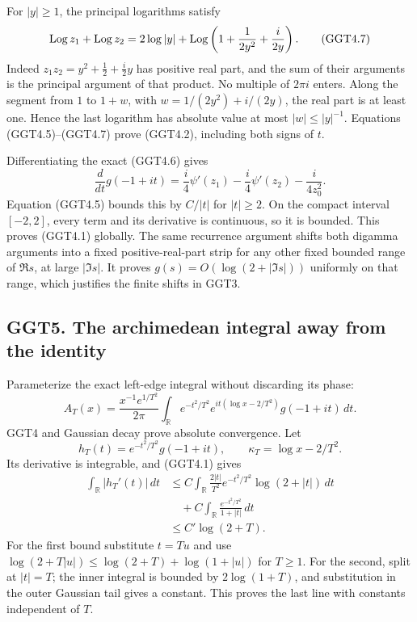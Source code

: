 For \(|y|\ge1\), the principal logarithms satisfy \[
\operatorname{Log} z_1+\operatorname{Log} z_2
=2\log|y|
+\operatorname{Log}\left(1+\frac1{2y^2}+\frac{i}{2y}\right).
\tag{GGT4.7}
\] Indeed \(z_1z_2=y^2+\tfrac12+\tfrac{i}{2}y\) has positive real part,
and the sum of their arguments is the principal argument of that
product. No multiple of \(2\pi i\) enters. Along the segment from \(1\)
to \(1+w\), with \(w=1/(2y^2)+i/(2y)\), the real part is at least one.
Hence the last logarithm has absolute value at most \(|w|\le |y|^{-1}\).
Equations (GGT4.5)--(GGT4.7) prove (GGT4.2), including both signs of
\(t\).

Differentiating the exact (GGT4.6) gives \[
\frac d{dt}g(-1+it)
=\frac i4\psi'(z_1)-\frac i4\psi'(z_2)
-\frac i{4z_0^2}.
\tag{GGT4.8}
\] Equation (GGT4.5) bounds this by \(C/|t|\) for \(|t|\ge2\). On the
compact interval \([-2,2]\), every term and its derivative is
continuous, so it is bounded. This proves (GGT4.1) globally. The same
recurrence argument shifts both digamma arguments into a fixed
positive-real-part strip for any other fixed bounded range of \(\Re s\),
at large \(|\Im s|\). It proves \(g(s)=O(\log(2+|\Im s|))\) uniformly on
that range, which justifies the finite shifts in GGT3.

\subsection{GGT5. The archimedean integral away from the
identity}\label{ggt5.-the-archimedean-integral-away-from-the-identity}

Parameterize the exact left-edge integral without discarding its phase:
\[
A_T(x)=\frac{x^{-1}e^{1/T^2}}{2\pi}
\int_{\mathbb R}e^{-t^2/T^2}
e^{it(\log x-2/T^2)}g(-1+it)\,dt.
\tag{GGT5.1}
\] GGT4 and Gaussian decay prove absolute convergence. Let \[
h_T(t)=e^{-t^2/T^2}g(-1+it),\qquad
\kappa_T=\log x-2/T^2.
\] Its derivative is integrable, and (GGT4.1) gives \[
\begin{aligned}
\int_{\mathbb R}|h_T'(t)|\,dt
&\le
C\int_{\mathbb R}\frac{2|t|}{T^2}
e^{-t^2/T^2}\log(2+|t|)\,dt\\
&\quad+C\int_{\mathbb R}\frac{e^{-t^2/T^2}}{1+|t|}\,dt\\
&\le C'\log(2+T).
\end{aligned}
\tag{GGT5.2}
\] For the first bound substitute \(t=Tu\) and use
\(\log(2+T|u|)\le\log(2+T)+\log(1+|u|)\) for \(T\ge1\). For the second,
split at \(|t|=T\); the inner integral is bounded by \(2\log(1+T)\), and
substitution in the outer Gaussian tail gives a constant. This proves
the last line with constants independent of \(T\).


